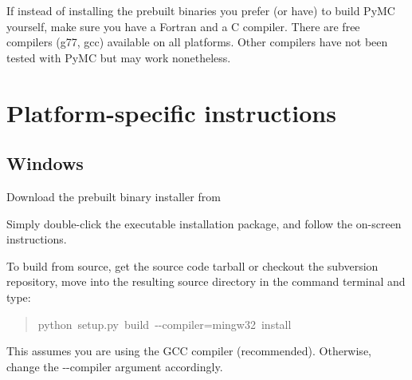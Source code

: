 If instead of installing the prebuilt binaries you prefer (or have) to build PyMC
yourself, make sure you have a Fortran and a C compiler. There are free
compilers (g77, gcc) available on all platforms. Other compilers have not been
tested with PyMC but may work nonetheless.



\hypertarget{platform-specific-instructions}{}
\section*{Platform-specific instructions}
\label{platform-specific-instructions}



\hypertarget{windows}{}
\subsection*{Windows}
\label{windows}
\begin{list}{.}
{
\setlength{\rightmargin}{\leftmargin}
}
\item {} 
Download the prebuilt binary installer from

\item {} 
Simply double-click the executable installation package, and follow the on-screen instructions.

\end{list}

To build from source, get the source code tarball or checkout the subversion
repository, move into the resulting source directory in the command terminal
and type:
\begin{quote}{\ttfamily \raggedright \noindent
python~setup.py~build~-{}-compiler=mingw32~install
}\end{quote}

This assumes you are using the GCC compiler (recommended). Otherwise,
change the -{}-compiler argument accordingly.



\hypertarget{mac-os-x}{}
